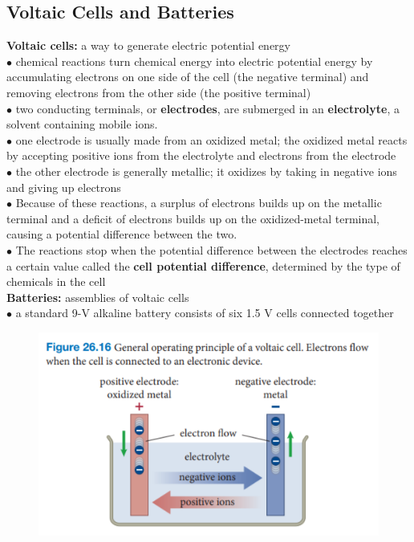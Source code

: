     \subsection{Voltaic Cells and Batteries}    %

        \textbf{Voltaic cells:} a way to generate electric potential energy \\
        $\bullet$ chemical reactions turn chemical energy into electric potential energy by accumulating electrons on one side of the cell (the negative terminal) and removing electrons from the other side (the positive
        terminal) \\
        $\bullet$ two conducting terminals, or \textbf{electrodes}, are submerged in an \textbf{electrolyte}, a solvent containing mobile ions. \\
        $\bullet$ one electrode is usually made from an oxidized metal; the oxidized metal reacts by accepting positive ions from the electrolyte and electrons from the electrode \\
        $\bullet$ the other electrode is generally metallic; it oxidizes by taking in negative ions and giving up electrons \\
        $\bullet$ Because of these reactions, a surplus of electrons builds up on the metallic terminal and a deficit of electrons builds up on the oxidized-metal terminal, causing a potential difference between the two. \\
        $\bullet$ The reactions stop when the potential difference between the electrodes reaches a certain value called the \textbf{cell potential difference}, determined by the type of chemicals in the cell \\
        \textbf{Batteries:} assemblies of voltaic cells \\
        $\bullet$ a standard 9-V alkaline battery consists of six 1.5 V cells connected together

        \begin{figure}[hbt!]
            \centering
            \includegraphics[scale = 0.75]{Resources/26.4_Voltaic_Cell}
        \end{figure}

